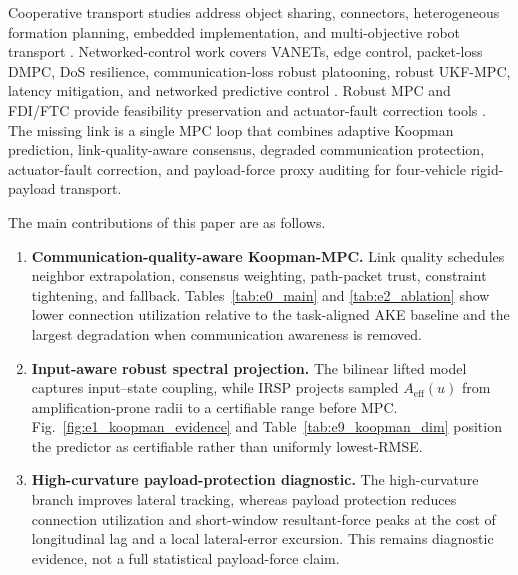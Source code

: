 \documentclass[letterpaper,journal]{IEEEtran}
\begin{document}
Cooperative transport studies address object sharing, connectors, heterogeneous formation planning, embedded implementation, and multi-objective robot transport \cite{an2023multiRobotCommTransport,cooperativeTransport2024ras,gong2023sixDofTransport,zhang2024heterogeneousTransport,embeddedFormationTransport2024cep,multiObjectiveTransport2024mechatronics,intelligentCollaborativeTransport2024}. Networked-control work covers VANETs, edge control, packet-loss DMPC, DoS resilience, communication-loss robust platooning, robust UKF-MPC, latency mitigation, and networked predictive control \cite{tan2022mlVehicularDcn,zhao2025blockchainVanetDcn,wu2025drlVecDcn,bian2025markovPacketLossDMPC,dosDMPC2024isa,robustCommunicationLoss2025trb,bai2023robustLongitudinalDMPC,bao2024robustUkfMpc,networkLatencyCav2024sensors,dai2024networkedPredictiveControl}. Robust MPC and FDI/FTC provide feasibility preservation and actuator-fault correction tools \cite{mayne2000constrainedMpc,mayne2005robustMpc,convexRobustDMPC2025ejc,gasparino2023nnMpcUncertainty,liu2024adaptiveFtcSbw,xu2024fdFtcSteering}. The missing link is a single MPC loop that combines adaptive Koopman prediction, link-quality-aware consensus, degraded communication protection, actuator-fault correction, and payload-force proxy auditing for four-vehicle rigid-payload transport.

The main contributions of this paper are as follows.
\begin{enumerate}
\item \textbf{Communication-quality-aware Koopman-MPC.} Link quality schedules neighbor extrapolation, consensus weighting, path-packet trust, constraint tightening, and fallback. Tables~\ref{tab:e0_main} and \ref{tab:e2_ablation} show lower connection utilization relative to the task-aligned AKE baseline and the largest degradation when communication awareness is removed.
\item \textbf{Input-aware robust spectral projection.} The bilinear lifted model captures input--state coupling, while IRSP projects sampled $A_{\mathrm{eff}}(u)$ from amplification-prone radii to a certifiable range before MPC. Fig.~\ref{fig:e1_koopman_evidence} and Table~\ref{tab:e9_koopman_dim} position the predictor as certifiable rather than uniformly lowest-RMSE.
\item \textbf{High-curvature payload-protection diagnostic.} The high-curvature branch improves lateral tracking, whereas payload protection reduces connection utilization and short-window resultant-force peaks at the cost of longitudinal lag and a local lateral-error excursion. This remains diagnostic evidence, not a full statistical payload-force claim.
\end{enumerate}
\end{document}
